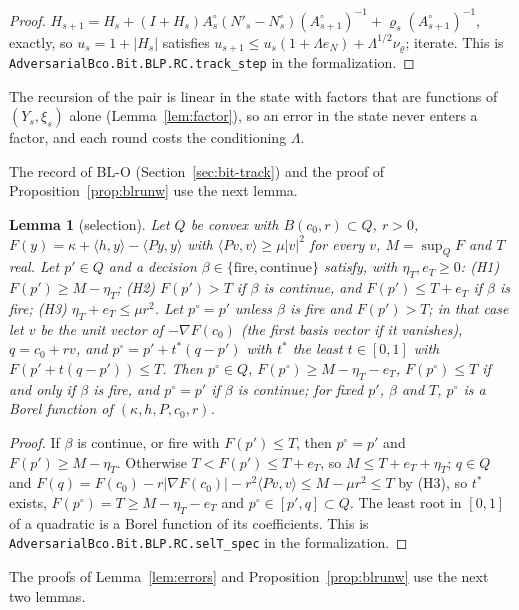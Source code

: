 \documentclass[11pt]{amsart}
\newtheorem{lemma}[theorem]{Lemma}
\theoremstyle{definition}
\numberwithin{equation}{section}
\newcommand{\ip}[1]{\langle #1\rangle}
\begin{document}
\begin{proof}
$H_{s+1}=H_s+(I+H_s)A^\circ_s(N'_s-N^\circ_s)(A^\circ_{s+1})^{-1}+\varrho_s(A^\circ_{s+1})^{-1}$, exactly, so $u_s=1+|H_s|$ satisfies $u_{s+1}\le u_s(1+\Lambda e_N)+\Lambda^{1/2}\nu_\varrho$; iterate.
This is \texttt{AdversarialBco.Bit.BLP.RC.track\_step} in the formalization.
\end{proof}

The recursion of the pair is linear in the state with factors that are functions of $(Y_s,\xi_s)$ alone (Lemma~\ref{lem:factor}), so an error in the state never enters a factor, and each round costs the conditioning $\Lambda$.

The record of BL-O (Section~\ref{sec:bit-track}) and the proof of Proposition~\ref{prop:blrunw} use the next lemma.

\begin{lemma}[selection]\label{lem:sel}
Let $Q$ be convex with $B(c_0,r)\subset Q$, $r>0$, $F(y)=\kappa+\ip{h,y}-\ip{Py,y}$ with $\ip{Pv,v}\ge\mu|v|^2$ for every $v$, $M=\sup_QF$ and $T$ real. Let $p'\in Q$ and a decision $\beta\in\{\text{fire},\text{continue}\}$ satisfy, with $\eta_T,e_T\ge0$: (H1) $F(p')\ge M-\eta_T$; (H2) $F(p')>T$ if $\beta$ is continue, and $F(p')\le T+e_T$ if $\beta$ is fire; (H3) $\eta_T+e_T\le\mu r^2$. Let $p^\circ=p'$ unless $\beta$ is fire and $F(p')>T$; in that case let $v$ be the unit vector of $-\nabla F(c_0)$ (the first basis vector if it vanishes), $q=c_0+rv$, and $p^\circ=p'+t^*(q-p')$ with $t^*$ the least $t\in[0,1]$ with $F(p'+t(q-p'))\le T$. Then $p^\circ\in Q$, $F(p^\circ)\ge M-\eta_T-e_T$, $F(p^\circ)\le T$ if and only if $\beta$ is fire, and $p^\circ=p'$ if $\beta$ is continue; for fixed $p'$, $\beta$ and $T$, $p^\circ$ is a Borel function of $(\kappa,h,P,c_0,r)$.
\end{lemma}

\begin{proof}
If $\beta$ is continue, or fire with $F(p')\le T$, then $p^\circ=p'$ and $F(p')\ge M-\eta_T$. Otherwise $T<F(p')\le T+e_T$, so $M\le T+e_T+\eta_T$; $q\in Q$ and $F(q)=F(c_0)-r|\nabla F(c_0)|-r^2\ip{Pv,v}\le M-\mu r^2\le T$ by (H3), so $t^*$ exists, $F(p^\circ)=T\ge M-\eta_T-e_T$ and $p^\circ\in[p',q]\subset Q$. The least root in $[0,1]$ of a quadratic is a Borel function of its coefficients.
This is \texttt{AdversarialBco.Bit.BLP.RC.selT\_spec} in the formalization.
\end{proof}

The proofs of Lemma~\ref{lem:errors} and Proposition~\ref{prop:blrunw} use the next two lemmas.
\end{document}
